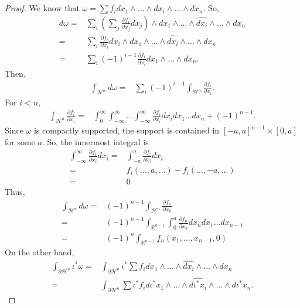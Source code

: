 \documentclass[]{article}
\theoremstyle{definition}
\theoremstyle{definition}
\begin{document}
\begin{proof}
    We know that $\omega=\sum f_i dx_1\wedge\dots\wedge\widehat{dx_i}\wedge\dots\wedge dx_n$. So, \begin{align*}
        d\omega=&\sum_i\left(\sum_j\frac{\partial f_i}{\partial x_j}dx_j\right)\wedge dx_1\wedge\dots\wedge\widehat{dx_i}\wedge\dots\wedge dx_n\\
        =&\sum_i\frac{\partial f_i}{\partial x_i}dx_i\wedge dx_1\wedge\dots\wedge\widehat{dx_i}\wedge\dots\wedge dx_n\\
        =&\sum_i(-1)^{i-1}\frac{\partial f_i}{\partial x_i}dx_1\wedge\dots\wedge dx_n.
    \end{align*}
    Then, \begin{align*}
        \int_{\mathcal{H}^n}d\omega=&\sum_i(-1)^{i-1}\int_{\mathcal{H}^n}\frac{\partial f_i}{\partial x_i}.
    \end{align*}
    For $i<n$, \begin{align*}
        \int_{\mathcal{H}^n}\frac{\partial f_i}{\partial x_i}=&\int_0^\infty\int_{-\infty}^\infty\dots\int_{-\infty}^\infty\frac{\partial f_i}{\partial x_i}dx_idx_1\dots dx_n+(-1)^{n-1}.
    \end{align*}
    Since $\omega$ is compactly supported, the support is contained in $[-a,a]^{n-1}\times [0,a]$ for some $a$. So, the innermost integral is
    \begin{align*}
        \int_{-\infty}^\infty\frac{\partial f_i}{\partial x_i}dx_i=&\int_{-a}^a\frac{\partial f_i}{\partial x_i}dx_i\\
        =&f_i(\dots,a,\dots)-f_i(\dots,-a, \dots)\\
        =&0
    \end{align*}
    Thus, \begin{align*}
        \int_{\mathcal{H}^n}d\omega=&(-1)^{n-1}\int_{\mathcal{H}^n}\frac{\partial f_n}{\partial x_n}\\
        =&(-1)^{n-1}\int_{\mathbb{R}^{n-1}}\int_0^a\frac{\partial f_n}{\partial x_n}dx_ndx_1\dots dx_{n-1}\\
        =&(-1)^n\int_{\mathbb{R}^{n-1}}f_n(x_1, \dots, x_{n-1}, 0)
    \end{align*}
    On the other hand, \begin{align*}
        \int_{\partial \mathcal{H}^n}\iota^*\omega=&\int_{\partial \mathcal{H}^n}\iota^*\sum f_i dx_1\wedge\dots\wedge\widehat{dx_i}\wedge\dots\wedge dx_n\\
        =&\int_{\partial \mathcal{H}^n}\sum \iota^*f_i d\iota^*x_1\wedge\dots\wedge\widehat{d\iota^*x_i}\wedge\dots\wedge d\iota^*x_n.

\end{align*}
\end{proof}
\end{document}
